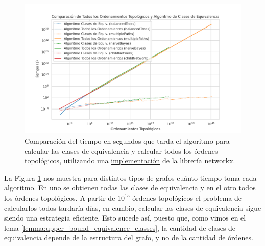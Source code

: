 \begin{figure}[ht]
	\centering
	\includegraphics[width=1\linewidth]{img/equivalentClassesVsAllToposorts_time.png}
	\caption[Caption for image]{Comparación del tiempo en segundos que tarda el algoritmo para calcular las clases de equivalencia y calcular todos los órdenes topológicos, utilizando una \href{https://networkx.org/documentation/stable/reference/algorithms/generated/networkx.algorithms.dag.all_topological_sorts.html}{implementación} de la librería networkx. \footnotemark }
	\label{fig:equivalenceClassesVsToposortsTimePlot}
\end{figure}



La Figura \ref{fig:equivalenceClassesVsToposortsTimePlot} nos muestra para distintos tipos de grafos cuánto tiempo toma cada algoritmo. En uno se obtienen todas las clases de equivalencia y en el otro todos los órdenes topológicos. A partir de $10^{15}$ órdenes topológicos el problema de calcularlos todos tardaría días, en cambio, calcular las clases de equivalencia sigue siendo una estrategia eficiente. Esto sucede así, puesto que, como vimos en el lema \ref{lemma:upper_bound_equivalence_classes}, la cantidad de clases de equivalencia depende de la estructura del grafo, y no de la cantidad de órdenes.

